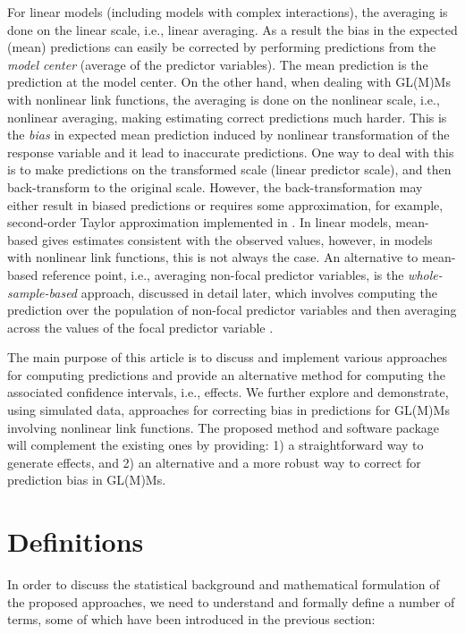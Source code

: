 For linear models (including models with complex interactions), the averaging is done on the linear scale, i.e., linear averaging. As a result the bias in the expected (mean) predictions can easily be corrected by performing predictions from the \emph{model center} (average of the predictor variables). The mean prediction is the prediction at the model center. On the other hand, when dealing with GL(M)Ms with nonlinear link functions, the averaging is done on the nonlinear scale, i.e., nonlinear averaging, making estimating correct predictions much harder. This is the \emph{bias} in expected mean prediction induced by nonlinear transformation of the response variable and it lead to inaccurate predictions. One way to deal with this is to make predictions on the transformed scale (linear predictor scale), and then back-transform to the original scale. However, the back-transformation may either result in biased predictions or requires some approximation, for example, second-order Taylor approximation implemented in  \citep{lenth2018package}. In linear models, mean-based gives estimates consistent with the observed values, however, in models with nonlinear link functions, this is not always the case. An alternative to mean-based reference point, i.e., averaging non-focal predictor variables, is the \emph{whole-sample-based} approach, discussed in detail later, which involves computing the prediction over the population of non-focal predictor variables and then averaging across the values of the focal predictor variable \citep{hanmer2013behind}. 


The main purpose of this article is to discuss and implement various approaches for computing predictions and provide an alternative method for computing the associated confidence intervals, i.e., effects. We further explore and demonstrate, using simulated data, approaches for correcting bias in predictions for GL(M)Ms involving nonlinear link functions. The proposed method and  software package will complement the existing ones by providing: 1) a straightforward way to generate effects, and 2) an alternative and a more robust way to correct for prediction bias in GL(M)Ms.

\section{Definitions}

In order to discuss the statistical background and mathematical formulation of the proposed approaches, we need to understand and formally define a number of terms, some of which have been introduced in the previous section:


